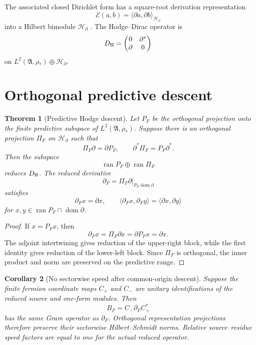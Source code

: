 \documentclass[11pt,oneside,openany]{book}
\numberwithin{equation}{chapter}
\newtheorem{theorem}{Theorem}[chapter]
\newtheorem{corollary}[theorem]{Corollary}
\theoremstyle{definition}
\theoremstyle{remark}
\newcommand{\ip}[2]{\langle #1,#2\rangle}
\begin{document}
The associated closed Dirichlet form has a square-root derivation representation
\[
 \mathcal E(a,b)=\ip{\partial a}{\partial b}_{\mathcal H_\partial}
\]
into a Hilbert bimodule $\mathcal H_\partial$ \cite{CiprianiSauvageot2003}.  The Hodge--Dirac operator is
\[
 D_{\rm H}
 =\begin{pmatrix}0&\partial^*\\ \partial&0\end{pmatrix}
\]
on $L^2(\mathfrak A,\rho_*)\oplus\mathcal H_\partial$.

\section{Orthogonal predictive descent}

\begin{theorem}[Predictive Hodge descent]
\label{thm:predictive-hodge}
Let $P_F$ be the orthogonal projection onto the finite predictive subspace of $L^2(\mathfrak A,\rho_*)$.  Suppose there is an orthogonal projection $\Pi_F$ on $\mathcal H_\partial$ such that
\[
 \Pi_F\partial=\partial P_F,
 \qquad
 \partial^*\Pi_F=P_F\partial^*.
\]
Then the subspace
\[
 \operatorname{ran}P_F\oplus\operatorname{ran}\Pi_F
\]
reduces $D_{\rm H}$.  The reduced derivative
\[
 \partial_F=\Pi_F\partial|_{P_F\operatorname{dom}\partial}
\]
satisfies
\[
 \partial_Fx=\partial x,
 \qquad
 \ip{\partial_Fx}{\partial_Fy}=\ip{\partial x}{\partial y}
\]
for $x,y\in\operatorname{ran}P_F\cap\operatorname{dom}\partial$.
\end{theorem}

\begin{proof}
If $x=P_Fx$, then
\[
 \partial_Fx=\Pi_F\partial x=\partial P_Fx=\partial x.
\]
The adjoint intertwining gives reduction of the upper-right block, while the first identity gives reduction of the lower-left block.  Since $\Pi_F$ is orthogonal, the inner product and norm are preserved on the predictive range.
\end{proof}

\begin{corollary}[No sectorwise speed after common-origin descent]
\label{cor:no-relative-speed}
Suppose the finite fermion coordinate maps $C_+$ and $C_-$ are unitary identifications of the reduced source and one-form modules.  Then
\[
 B_F=C_-\partial_FC_+^*
\]
has the same Gram operator as $\partial_F$.  Orthogonal representation projections therefore preserve their sectorwise Hilbert--Schmidt norms.  Relative source--residue speed factors are equal to one for the actual reduced operator.
\end{corollary}
\end{document}

